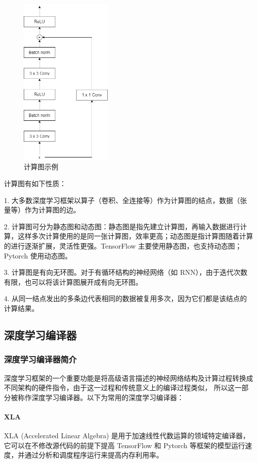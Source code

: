 \begin{figure}[h]
    \centering
    \includegraphics[width=0.4\textwidth]{figures/computational_graph.png}
    \caption{计算图示例}
    \label{fig:graph1}
\end{figure}

计算图有如下性质：

1. 大多数深度学习框架以算子（卷积、全连接等）作为计算图的结点，数据（张量等）作为计算图的边。

2. 计算图可分为静态图和动态图：静态图是指先建立计算图，再输入数据进行计算，这样多次计算使用的是同一张计算图，效率更高；动态图是指计算图随着计算的进行逐渐扩展，灵活性更强。TensorFlow 主要使用静态图，也支持动态图；Pytorch 使用动态图。

3. 计算图是有向无环图。对于有循环结构的神经网络（如 RNN），由于迭代次数有限，也可以将该计算图展开成有向无环图。

4. 从同一结点发出的多条边代表相同的数据被复用多次，因为它们都是该结点的计算结果。

\subsection{深度学习编译器}
\subsubsection{深度学习编译器简介}
深度学习框架的一个重要功能是将高级语言描述的神经网络结构及计算过程转换成不同架构的硬件指令，由于这一过程和传统意义上的编译过程类似，
所以这一部分被称作深度学习编译器\cite{DLcompiler}。以下为常用的深度学习编译器：

\paragraph{XLA \cite{50530}}
XLA (Accelerated Linear Algebra) 是用于加速线性代数运算的领域特定编译器，
它可以在不修改源代码的前提下提高 TensorFlow 和 Pytorch 等框架的模型运行速度，并通过分析和调度程序运行来提高内存利用率。

